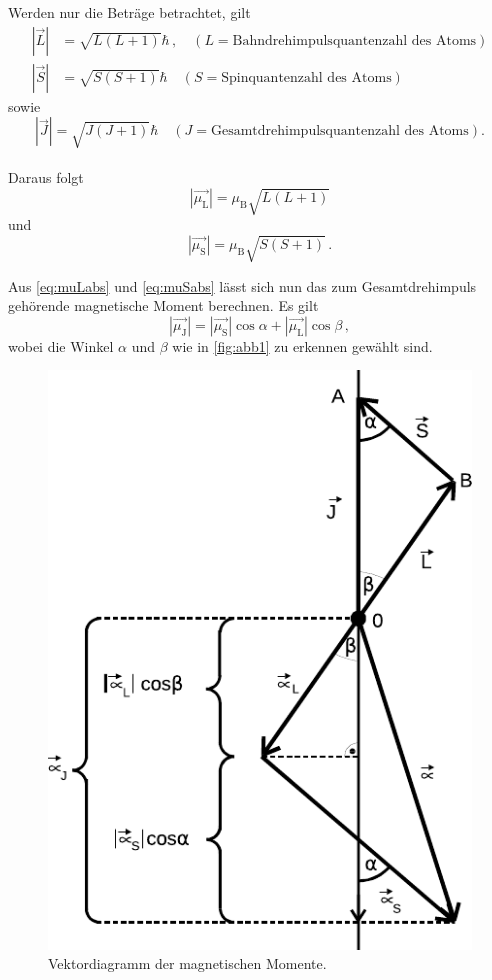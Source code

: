 Werden nur die Beträge betrachtet, gilt
\begin{align}
    |\vec{L}| &= \sqrt{L(L + 1)} \hbar \,, \quad (L = \text{Bahndrehimpulsquantenzahl des Atoms}) 
    \label{eq:Labs} \\
    |\vec{S}| &= \sqrt{S(S + 1)} \hbar \quad (S = \text{Spinquantenzahl des Atoms})
    \label{eq:Sabs}
\end{align}
sowie
\begin{equation}
    |\vec{J}| = \sqrt{J(J + 1)} \hbar \quad (J = \text{Gesamtdrehimpulsquantenzahl des Atoms}).
    \label{eq:Jabs}
\end{equation} \\

Daraus folgt
\begin{equation}
    |\vec{\mu_\text{L}}| = \mu_\text{B} \sqrt{L(L + 1)}
    \label{eq:muLabs}
\end{equation}
und
\begin{equation}
    |\vec{\mu_\text{S}}| = \mu_\text{B} \sqrt{S(S + 1)} \,.
    \label{eq:muSabs}
\end{equation}

Aus \eqref{eq:muLabs} und \eqref{eq:muSabs} lässt sich nun das zum Gesamtdrehimpuls gehörende magnetische Moment
berechnen.
Es gilt
\begin{equation}
    |\vec{\mu_\text{J}}| = |\vec{\mu_\text{S}}| \cos \alpha + |\vec{\mu_\text{L}}| \cos\beta \,,
\end{equation}
wobei die Winkel $\alpha$ und $\beta$ wie in \autoref{fig:abb1} zu erkennen gewählt sind.

\begin{figure}
    \centering
    \includegraphics{figures/Abb_1.pdf}
    \caption{Vektordiagramm der magnetischen Momente\cite{ap07}.}
    \label{fig:abb1}
\end{figure}

